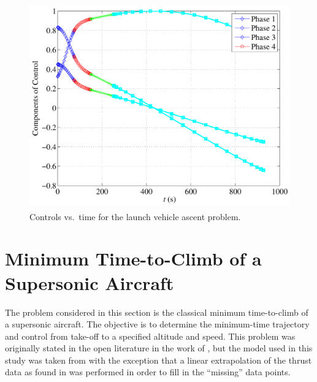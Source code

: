 \documentclass[10pt,final]{report}
\begin{document}
\begin{figure}[H]
  \centering
  \includegraphics[height=3.5in]{uvstLaunch.pdf}
  \caption{Controls vs.~time for the launch vehicle ascent problem.}
\end{figure}

\section{Minimum Time-to-Climb of a Supersonic Aircraft}

The problem considered in this section is the classical minimum
time-to-climb of a supersonic aircraft.  The objective is to determine
the minimum-time trajectory and control from take-off to a specified
altitude and speed.  This problem was originally stated in the open
literature in the work of , but the model used in
this study was taken from  with the exception that
a linear extrapolation of the thrust data as found in
 was performed in order to fill in the ``missing''
data points.
\end{document}
